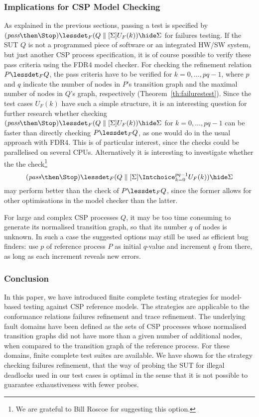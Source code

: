 \subsubsection*{Implications for CSP Model Checking}
As explained in the previous sections, passing a test is specified by
$(\epass\then\Stop) \lessdet_F (Q\parallel[\Sigma] U_F(k)) \hide \Sigma$
for failures testing. If the SUT $Q$ is not a programmed piece of software or
an integrated HW/SW system, but just another CSP process specification,
it is of course possible to verify these pass criteria using the FDR4 model checker.
For checking the refinement relation $P\lessdet_F Q$, the pass criteria have to be verified
for $k=0,\dots,pq-1$, where $p$ and $q$ indicate the number of nodes in $P$'s transition
graph and the maximal number of nodes in $Q$'s graph, respectively (Theorem~\ref{th:failurestest}). Since the test cases
$U_F(k)$ have such a simple structure, it is an interesting question for further 
research whether checking 
$(\epass\then\Stop) \lessdet_F (Q\parallel[\Sigma] U_F(k)) \hide \Sigma$ for $k=0,\dots,pq-1$ can be faster than directly 
checking $P\lessdet_F Q$, as one would do in the usual 
approach with FDR4. This is of particular interest, since the checks could be parallelised 
on several CPUs. Alternatively it is interesting to investigate whether the
the check\footnote{We are grateful to Bill Roscoe for suggesting this option.}
\[
(\epass\then\Stop) \lessdet_F (Q\parallel[\Sigma] \Intchoice_{k=0}^{pq-1} U_F(k)) \hide \Sigma
\]
may perform better than the check of $P\lessdet_F Q$, since the former allows for 
other optimisations in the model checker than the latter.

For large and complex CSP processes $Q$, it may be too time consuming to generate
its normalised transition graph, so that its number $q$ of nodes is unknown. 
In such a case the suggested options may still be used
as efficient bug finders: use  $p$ of reference process $P$ as initial $q$-value
and 
increment $q$ from there, as long as each increment reveals new errors.
 




\subsubsection*{Conclusion}

In this paper, we have introduced finite complete testing strategies for 
model-based testing against CSP reference models. The strategies are applicable   
to the conformance relations failures refinement and trace refinement. The underlying fault domains have been defined as the sets of CSP processes whose normalised transition
graphs did not have more than a given number of additional nodes, when compared to the transition graph of the reference process. For these domains, finite complete 
test suites are available. We have shown for the strategy checking failures refinement,
 that the way of probing the SUT for illegal deadlocks used in our test cases is 
 optimal in the sense that it is not possible to guarantee exhaustiveness with fewer
 probes. 


